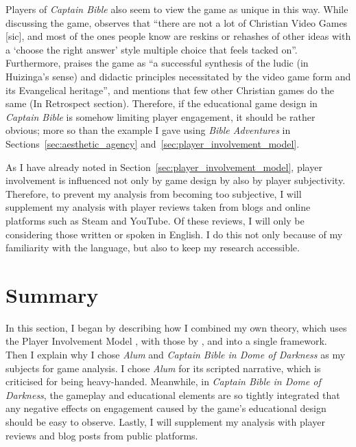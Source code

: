 Players of \textit{Captain Bible} also seem to view the game as unique in this way. While discussing the game, \textcite[Shucks, Why Do You Want Me To Play This? section, para.~5]{annk526_captain_2024} observes that ``there are not a lot of Christian Video Games [sic], and most of the ones people know are reskins or rehashes of other ideas with a `choose the right answer' style multiple choice that feels tacked on''. Furthermore, \textcite[para. 1]{censorious_idler_captain_2018} praises the game as ``a successful synthesis of the ludic (in Huizinga’s sense) and didactic principles necessitated by the video game form and its Evangelical heritage'', and mentions that few other Christian games do the same (In Retrospect section). Therefore, if the educational game design in \textit{Captain Bible} is somehow limiting player engagement, it should be rather obvious; more so than the example I gave using \textit{Bible Adventures} in Sections~\ref{sec:aesthetic_agency} and~\ref{sec:player_involvement_model}.

As I have already noted in Section~\ref{sec:player_involvement_model}, player involvement is influenced not only by game design by also by player subjectivity. Therefore, to prevent my analysis from becoming too subjective, I will supplement my analysis with player reviews taken from blogs and online platforms such as Steam and YouTube. Of these reviews, I will only be considering those written or spoken in English. I do this not only because of my familiarity with the language, but also to keep my research accessible.

\section{Summary}

In this section, I began by describing how I combined my own theory, which uses the Player Involvement Model \parencite{calleja_in_game_2011}, with those by \textcite{king_virtue_2017}, and \textcite{repp_whats_2012} into a single framework. Then I explain why I chose \textit{Alum} \parencite{orsie_alum_2006} and \textit{Captain Bible in Dome of Darkness} \parencite{engelbrite_captain_1994} as my subjects for game analysis. I chose \textit{Alum} for its scripted narrative, which is criticised for being heavy-handed.  Meanwhile, in \textit{Captain Bible in Dome of Darkness}, the gameplay and educational elements are so tightly integrated that any negative effects on engagement caused by the game’s educational design should be easy to observe. Lastly, I will supplement my analysis with player reviews and blog posts from public platforms.